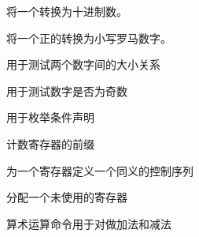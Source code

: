 \documentclass{book}
\begin{document}
\begin{inventory}
\item [\cs{number}]
将一个转换为十进制数。

\item [\cs{romannumeral}]
      
      将一个正的转换为小写罗马数字。

\item [\cs{ifnum}]
      用于测试两个数字间的大小关系

\item [\cs{ifodd}]
      用于测试数字是否为奇数

\item [\cs{ifcase}]
      用于枚举条件声明


\item [\cs{count}]
      计数寄存器的前缀

\item [\cs{countdef}]
      为一个寄存器定义一个同义的控制序列

\item [\cs{newcount}]
      分配一个未使用的寄存器

\item [\cs{advance}]
      算术运算命令用于对做加法和减法


\end{inventory}
\end{document}
